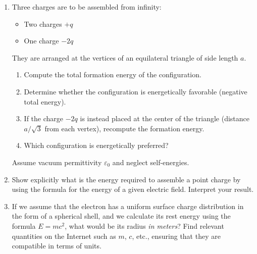 \documentclass[12pt]{article}
\begin{document}
\begin{enumerate}
\begin{enumerate}
    \item Using the field-energy expression
    \[
    U = \frac{\varepsilon_0}{2} \int_{\text{all space}} E^2 \, d\tau,
    \]
    compute the total electrostatic self-energy of the charge distribution.
    
    \item Express your final answer in terms of $Q$ and $R$ only.
    
    \item Compare your result with the well-known result for a uniformly charged sphere:
    \[
    U_{\text{uniform}} = \frac{3Q^2}{20\pi \varepsilon_0 R}.
    \]
    \end{enumerate}
    \newpage
    \item Three charges are to be assembled from infinity:

    \begin{itemize}
    \item Two charges \(+q\)
    \item One charge \(-2q\)
    \end{itemize}

    They are arranged at the vertices of an equilateral triangle of side length \(a\).

    \begin{enumerate}
    \item Compute the total formation energy of the configuration.
    \item Determine whether the configuration is energetically favorable (negative total energy).
    \item If the charge \(-2q\) is instead placed at the center of the triangle (distance \(a/\sqrt{3}\) from each vertex), recompute the formation energy.
    \item Which configuration is energetically preferred?
    \end{enumerate}

    Assume vacuum permittivity \(\varepsilon_0\) and neglect self-energies.

    \item Show explicitly what is the energy required to assemble a point charge by using the formula for the energy of a given electric field. Interpret your result.
    
    \item  If we assume that the electron has a uniform surface charge distribution in the form of a spherical shell, and we calculate its rest energy using the formula $E=mc^2$, what would be its radius \textit{in meters}? Find relevant quantities on the Internet such as $m$, $c$, etc., ensuring that they are compatible in terms of units.
    

\end{enumerate}
\end{document}
